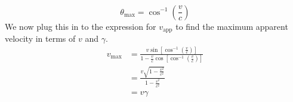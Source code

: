 \documentclass{article}
\begin{document}
\begin{enumerate}[label=\alph*.]
\begin{equation}
\begin{split}
        \end{split}
    \end{equation}
    \begin{equation}
        \boxed{\theta_\textrm{max} = \cos^{-1} \left(\frac{v}{c}\right)}
    \end{equation}
    We now plug this in to the expression for $v_\textrm{app}$ to find the maximum apparent velocity in terms of $v$ and $\gamma$.
    \begin{equation}
        \begin{split}
            v_{\textrm{max}} &= \frac{v\sin \left[\cos^{-1} \left(\frac{v}{c}\right)\right]}{1 - \frac{v}{c} \cos \left[\cos^{-1} \left(\frac{v}{c}\right)\right]}\\
            &= \frac{v\sqrt{1 - \frac{v^2}{c^2}}}{1 - \frac{v^2}{c^2}} \\
            & = v \gamma
        \end{split}
    \end{equation}
\end{enumerate}
\end{document}
